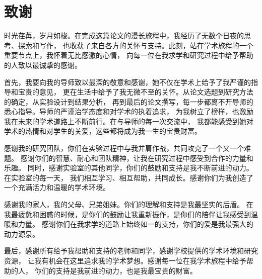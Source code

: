 \chapter{致\hspace{\ccwd}谢}
时光荏苒，岁月如梭。在完成这篇论文的漫长旅程中，我经历了无数个日夜的思考、探索和写作，
也收获了来自各方的关怀与支持。此刻，站在学术旅程的一个重要节点上，我怀着无比感激的心情，
向每一位在我求学和研究过程中给予帮助的人致以最诚挚的感谢。

首先，我要向我的导师致以最深的敬意和感谢，她不仅在学术上给予了我严谨的指导和宝贵的意见，
更在生活中给予了我无微不至的关怀。从论文选题到研究方法的确定，从实验设计到结果分析，
再到最后的论文撰写，每一步都离不开导师的悉心指导。导师的严谨治学态度和对学术的执着追求，
为我树立了榜样，也激励我在未来的学术道路上不断前行。在与导师的每一次交流中，
我都能感受到她对学术的热情和对学生的关爱，这些都将成为我一生的宝贵财富。

感谢我的研究团队，你们在实验过程中与我并肩作战，共同攻克了一个又一个难题。
感谢你们的智慧、耐心和团队精神，让我在研究过程中感受到合作的力量和乐趣。
同时，感谢实验室的其他同学，你们的鼓励和支持是我不断前进的动力。在实验室的每一天，
我们相互学习、相互帮助，共同成长。感谢你们为我创造了一个充满活力和温暖的学术环境。

感谢我的家人，我的父母、兄弟姐妹。你们的理解和支持是我最坚实的后盾。
在我最疲惫和困惑的时候，是你们的鼓励让我重新振作，是你们的陪伴让我感受到温暖和力量。
感谢你们在我求学的道路上始终如一的支持，你们的爱是我最强大的动力源泉。

最后，感谢所有给予我帮助和支持的老师和同学，感谢学校提供的学术环境和研究资源，
让我有机会在这里追求我的学术梦想。感谢每一位在我学术旅程中给予帮助的人，
你们的支持是我前进的动力，也是我最宝贵的财富。


